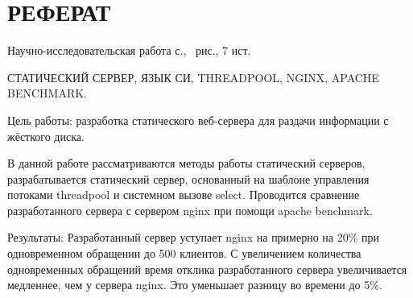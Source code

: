 \section*{РЕФЕРАТ}

Научно-исследовательская работа \pageref{LastPage} с., \totalfigures\ рис., 7 ист.

СТАТИЧЕСКИЙ СЕРВЕР, ЯЗЫК СИ, THREADPOOL, NGINX, APACHE BENCHMARK.

Цель работы: разработка статического веб-сервера для раздачи информации с жёсткого диска.

В данной работе рассматриваются методы работы статический серверов, разрабатывается статический сервер, основанный на шаблоне управления потоками threadpool и системном вызове select. Проводится сравнение разработанного сервера с сервером nginx при помощи apache benchmark.

Результаты: Разработанный сервер уступает nginx на примерно на 20\% при одновременном обращении до 500 клиентов. С увеличением количества одновременных обращений время отклика разработанного сервера увеличивается медленнее, чем у сервера nginx. Это уменьшает разницу во времени до 5\%.

\pagebreak